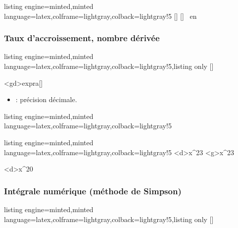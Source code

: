 \documentclass[11pt,a4paper]{ltxdoc}
\begin{document}
\begin{tcblisting}{listing engine=minted,minted language=latex,colframe=lightgray,colback=lightgray!5}
  [\MonMin]
  [\MonMinX]
\MonMin\ en \MonMinX
\end{tcblisting}

\subsubsection{Taux d'accroissement, nombre dérivée}

\begin{tcblisting}{listing engine=minted,minted language=latex,colframe=lightgray,colback=lightgray!5,listing only}
[\macro]

\tkzgDeriveeNum*[précision]<gd>{expr}{a}[\macro]
\end{tcblisting}

\begin{itemize}
  \item \MontreCode{[précision]} : précision décimale.
\end{itemize}

\begin{tcblisting}{listing engine=minted,minted language=latex,colframe=lightgray,colback=lightgray!5}
\end{tcblisting}

\begin{tcblisting}{listing engine=minted,minted language=latex,colframe=lightgray,colback=lightgray!5}
\tkzgDeriveeNum<d>{x^2}{3}        %
\tkzgDeriveeNum<g>{x^2}{3}        %

\tkzgDeriveeNum<d>{x^2}{0}        %

\end{tcblisting}

\subsubsection{Intégrale numérique (méthode de Simpson)}

\begin{tcblisting}{listing engine=minted,minted language=latex,colframe=lightgray,colback=lightgray!5,listing only}
[\macro]
\end{tcblisting}
\end{document}
